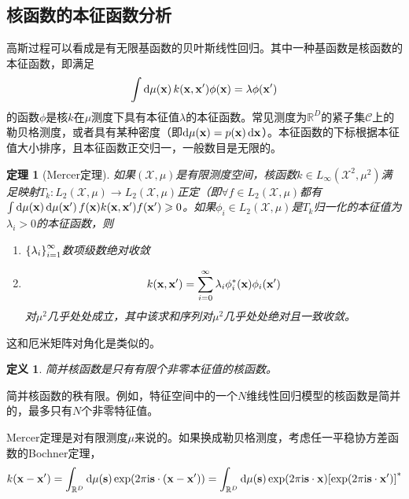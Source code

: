 \documentclass[12pt,UTF8]{article}
\newtheorem{theorem}{定理}[section]
\newtheorem{definition}{定义}[section]
\begin{document}
        \subsection{核函数的本征函数分析}
            高斯过程可以看成是有无限基函数的贝叶斯线性回归。其中一种基函数是核函数的本征函数，即满足
            \begin{equation}
                \int{\dd{\mu(\vb{x})}k(\vb{x},\vb{x}')\phi(\vb{x})}=\lambda\phi(\vb{x}')
            \end{equation}
            的函数$\phi$是核$k$在$\mu$测度下具有本征值$\lambda$的本征函数。常见测度为$\mathbb{R}^D$的紧子集$\mathcal{C}$上的勒贝格测度，或者具有某种密度（即$\dd{\mu(\vb{x})}=p(\vb{x})\dd{\vb{x}}$）。本征函数的下标根据本征值大小排序，且本征函数正交归一，一般数目是无限的。\par
            \begin{theorem}[Mercer定理]
                如果$(\mathcal{X},\mu)$是有限测度空间，核函数$k\in L_\infty(\mathcal{X}^2,\mu^2)$满足映射$T_k:L_2(\mathcal{X},\mu)\rightarrow L_2(\mathcal{X},\mu)$正定（即$\forall f\in L_2(\mathcal{X},\mu)$都有$\int{\dd{\mu(\vb{x})}\dd{\mu(\vb{x}')}f(\vb{x})k(\vb{x},\vb{x}')f(\vb{x}')}\geqslant 0$。如果$\phi_i\in L_2(\mathcal{X},\mu)$是$T_k$归一化的本征值为$\lambda_i>0$的本征函数，则
                \begin{enumerate}[label=\arabic*)]
                    \item $\qty{\lambda_i}_{i=1}^{\infty}$数项级数绝对收敛
                    \item \begin{equation}
                        k(\vb{x},\vb{x}')=\sum_{i=0}^{\infty}{\lambda_i\phi_i^*(\vb{x})\phi_i(\vb{x}')}
                    \end{equation}
                    对$\mu^2$几乎处处成立，其中该求和序列对$\mu^2$几乎处处绝对且一致收敛。
                \end{enumerate}
            \end{theorem}
            这和厄米矩阵对角化是类似的。\par
            \begin{definition}
                简并核函数是只有有限个非零本征值的核函数。
            \end{definition}
            简并核函数的秩有限。例如，特征空间中的一个$N$维线性回归模型的核函数是简并的，最多只有$N$个非零特征值。\par
            Mercer定理是对有限测度$\mu$来说的。如果换成勒贝格测度，考虑任一平稳协方差函数的Bochner定理，
            \begin{equation}
                k(\vb{x}-\vb{x}')=\int_{\mathbb{R}^D}{\dd{\mu(\vb{s})}\exp(2\pi\mathrm{i}\vb{s}\cdot(\vb{x}-\vb{x}'))}=\int_{\mathbb{R}^D}{\dd{\mu(\vb{s})}\exp(2\pi\mathrm{i}\vb{s}\cdot\vb{x})\qty[\exp(2\pi\mathrm{i}\vb{s}\cdot\vb{x}')]^*}
            \end{equation}
\end{document}
